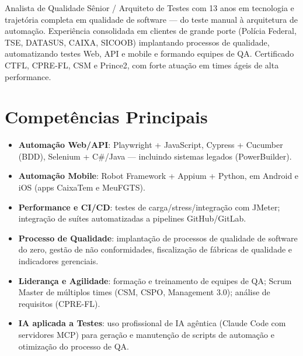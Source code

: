 \documentclass[11pt,a4paper,sans]{moderncv}
\begin{document}
\makecvtitle


\vspace{6pt}
\small{Analista de Qualidade Sênior / Arquiteto de Testes com 13 anos em tecnologia e trajetória completa em qualidade de software — do teste manual à arquitetura de automação. Experiência consolidada em clientes de grande porte (Polícia Federal, TSE, DATASUS, CAIXA, SICOOB) implantando processos de qualidade, automatizando testes Web, API e mobile e formando equipes de QA. Certificado CTFL, CPRE-FL, CSM e Prince2, com forte atuação em times ágeis de alta performance.}


\section{Competências Principais}
\vspace{1pt}
\begin{itemize}

\item \textbf{Automação Web/API}: Playwright + JavaScript, Cypress + Cucumber (BDD), Selenium + C\#/Java — incluindo sistemas legados (PowerBuilder).

\item \textbf{Automação Mobile}: Robot Framework + Appium + Python, em Android e iOS (apps CaixaTem e MeuFGTS).

\item \textbf{Performance e CI/CD}: testes de carga/stress/integração com JMeter; integração de suítes automatizadas a pipelines GitHub/GitLab.

\item \textbf{Processo de Qualidade}: implantação de processos de qualidade de software do zero, gestão de não conformidades, fiscalização de fábricas de qualidade e indicadores gerenciais.

\item \textbf{Liderança e Agilidade}: formação e treinamento de equipes de QA; Scrum Master de múltiplos times (CSM, CSPO, Management 3.0); análise de requisitos (CPRE-FL).

\item \textbf{IA aplicada a Testes}: uso profissional de IA agêntica (Claude Code com servidores MCP) para geração e manutenção de scripts de automação e otimização do processo de QA.

\end{itemize}
\end{document}
